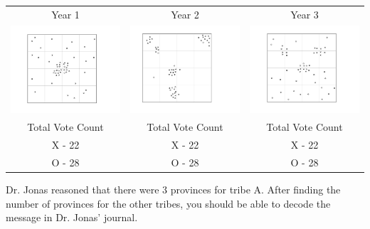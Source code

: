 \begin{tabular}{c c c }

Year 1 & Year 2 & Year 3 \\
 \includegraphics[width=2in]{assets/Gerrymandering/Gerry4x4-50-1.pdf} &  \includegraphics[width=2in]{assets/Gerrymandering/Gerry4x4-50-2.pdf} &  \includegraphics[width=2in]{assets/Gerrymandering/Gerry4x4-50-3.pdf}\\
 Total Vote Count &  Total Vote Count &  Total Vote Count\\
 X - 22 & X - 22 & X  - 22\\
 O - 28 & O - 28 & O - 28
\end{tabular}

Dr. Jonas reasoned that there were 3 provinces for tribe A.
After finding the number of provinces for the other tribes, you should be able to decode the message in Dr. Jonas' journal.
